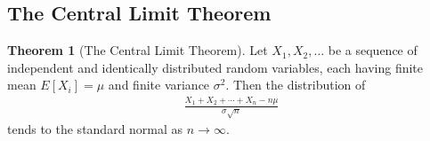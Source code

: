 \documentclass[10pt]{article}
\theoremstyle{definition}
\theoremstyle{theorem}
\newtheorem*{theorem}{Theorem}
\begin{document}
		\subsection*{The Central Limit Theorem}
		
		\begin{theorem}[The Central Limit Theorem]
			Let \(X_1, X_2,\ldots\) be a sequence of independent and identically distributed random variables, each having finite mean \(E[X_i]=\mu\) and finite variance \(\sigma^2\). Then the distribution of
			\begin{align*}
				\frac{X_1 + X_2 + \cdots + X_n - n\mu}{\sigma \sqrt{n}}
			\end{align*}
			tends to the standard normal as \(n \to \infty\).
		\end{theorem}
\end{document}
